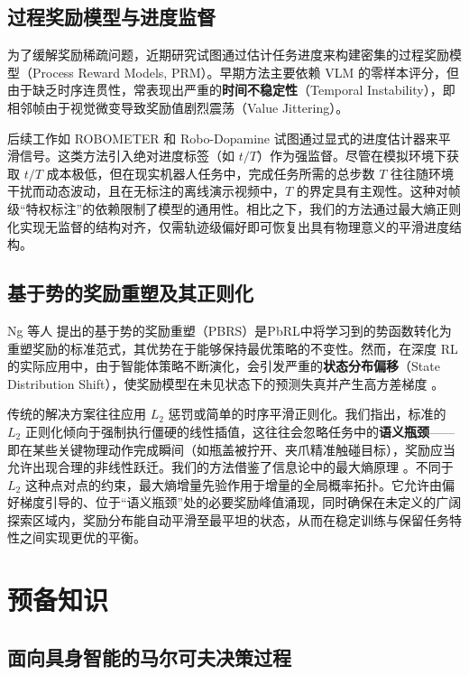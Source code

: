 \subsection{过程奖励模型与进度监督}

为了缓解奖励稀疏问题，近期研究试图通过估计任务进度来构建密集的过程奖励模型（Process Reward Models, PRM）。早期方法主要依赖 VLM 的零样本评分，但由于缺乏时序连贯性，常表现出严重的\textbf{时间不稳定性}（Temporal Instability），即相邻帧由于视觉微变导致奖励值剧烈震荡（Value Jittering）。

后续工作如 ROBOMETER \cite{robometer2026} 和 Robo-Dopamine \cite{robodopamine2025} 试图通过显式的进度估计器来平滑信号。这类方法引入绝对进度标签（如 $t/T$）作为强监督。尽管在模拟环境下获取 $t/T$ 成本极低，但在现实机器人任务中，完成任务所需的总步数 $T$ 往往随环境干扰而动态波动，且在无标注的离线演示视频中，$T$ 的界定具有主观性。这种对帧级“特权标注”的依赖限制了模型的通用性。相比之下，我们的方法通过最大熵正则化实现无监督的结构对齐，仅需轨迹级偏好即可恢复出具有物理意义的平滑进度结构。

\subsection{基于势的奖励重塑及其正则化}
\label{sec:pbrs_regularization}

Ng 等人 \cite{ng1999policy} 提出的基于势的奖励重塑（PBRS）是PbRL中将学习到的势函数转化为重塑奖励的标准范式，其优势在于能够保持最优策略的不变性。然而，在深度 RL 的实际应用中，由于智能体策略不断演化，会引发严重的\textbf{状态分布偏移}（State Distribution Shift），使奖励模型在未见状态下的预测失真并产生高方差梯度 \cite{liang2022rune}。

传统的解决方案往往应用 $L_2$ 惩罚或简单的时序平滑正则化。我们指出，标准的 $L_2$ 正则化倾向于强制执行僵硬的线性插值，这往往会忽略任务中的\textbf{语义瓶颈}——即在某些关键物理动作完成瞬间（如瓶盖被拧开、夹爪精准触碰目标），奖励应当允许出现合理的非线性跃迁。我们的方法借鉴了信息论中的最大熵原理 \cite{shannon1948, jaynes1957}。不同于 $L_2$ 这种点对点的约束，最大熵增量先验作用于增量的全局概率拓扑。它允许由偏好梯度引导的、位于“语义瓶颈”处的必要奖励峰值涌现，同时确保在未定义的广阔探索区域内，奖励分布能自动平滑至最平坦的状态，从而在稳定训练与保留任务特性之间实现更优的平衡。

\section{预备知识}

\subsection{面向具身智能的马尔可夫决策过程}

